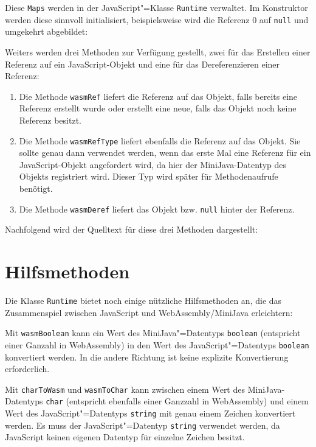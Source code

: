 Diese \lstinline{Maps} werden in der JavaScript"=Klasse \lstinline{Runtime} verwaltet. Im Konstruktor werden diese sinnvoll initialisiert, beispielsweise wird die Referenz 0 auf \lstinline{null} und umgekehrt abgebildet:



Weiters werden drei Methoden zur Verfügung gestellt, zwei für das Erstellen einer Referenz auf ein JavaScript-Objekt und eine für das Dereferenzieren einer Referenz:
\begin{enumerate}
    \item Die Methode \lstinline{wasmRef} liefert die Referenz auf das Objekt, falls bereits eine Referenz erstellt wurde oder erstellt eine neue, falls das Objekt noch keine Referenz besitzt.
    \item Die Methode \lstinline{wasmRefType} liefert ebenfalls die Referenz auf das Objekt. Sie sollte genau dann verwendet werden, wenn das erste Mal eine Referenz für ein Ja\-va\-Script-Ob\-jekt angefordert wird, da hier der MiniJava-Datentyp des Objekts registriert wird. Dieser Typ wird später für Methodenaufrufe benötigt.
    \item Die Methode \lstinline{wasmDeref} liefert das Objekt bzw. \lstinline{null} hinter der Referenz.
\end{enumerate}

Nachfolgend wird der Quelltext für diese drei Methoden dargestellt:



\section{Hilfsmethoden}

Die Klasse \lstinline{Runtime} bietet noch einige nützliche Hilfsmethoden an, die das Zusammenspiel zwischen JavaScript und WebAssembly/MiniJava erleichtern:



Mit \lstinline{wasmBoolean} kann ein Wert des MiniJava"=Datentyps \lstinline{boolean} (entspricht einer Ganzahl in WebAssembly) in den Wert des JavaScript"=Datentyps \lstinline{boolean} konvertiert werden. In die andere Richtung ist keine explizite Konvertierung erforderlich.

Mit \lstinline{charToWasm} und \lstinline{wasmToChar} kann zwischen einem Wert des MiniJava-Datentyps \lstinline{char} (entspricht ebenfalls einer Ganzzahl in WebAssembly) und einem Wert des JavaScript"=Datentyps \lstinline{string} mit genau einem Zeichen konvertiert werden.
Es muss der JavaScript"=Datentyp \lstinline{string} verwendet werden, da JavaScript keinen eigenen Datentyp für einzelne Zeichen besitzt.


